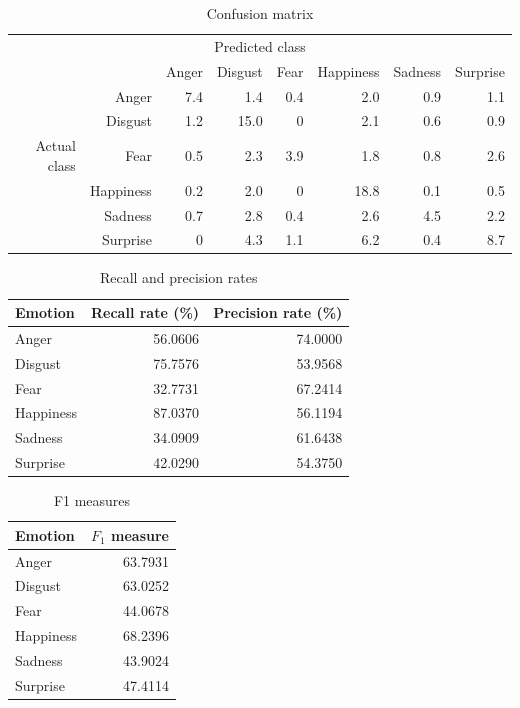\documentclass[12pt]{article}
\begin{document}
\begin{table}
\centering
\begin{tabular}{r r | r r r r r r}
\multicolumn{8}{c}{Predicted class} \\
&  & Anger & Disgust & Fear & Happiness & Sadness & Surprise \\
\hline
& Anger & 7.4 & 1.4  & 0.4 & 2.0  & 0.9 & 1.1 \\
 & Disgust & 1.2 & 15.0 & 0   & 2.1  & 0.6 & 0.9 \\
Actual class & Fear & 0.5 & 2.3  & 3.9 & 1.8  & 0.8 & 2.6 \\
 & Happiness & 0.2 & 2.0  & 0   & 18.8 & 0.1 & 0.5 \\
& Sadness & 0.7 & 2.8  & 0.4 & 2.6  & 4.5 & 2.2 \\
& Surprise & 0   & 4.3  & 1.1 & 6.2  & 0.4 & 8.7 \\
\end{tabular}
\caption{Confusion matrix}
\end{table}

\begin{table}
\centering
\begin{tabular}{l | r r}
Emotion & Recall rate (\%) & Precision rate (\%) \\
\hline
Anger & 56.0606 & 74.0000 \\
Disgust & 75.7576 & 53.9568 \\
Fear & 32.7731 & 67.2414 \\
Happiness & 87.0370 & 56.1194 \\
Sadness & 34.0909 & 61.6438 \\
Surprise & 42.0290 & 54.3750 \\
\end{tabular}
\caption{Recall and precision rates}
\end{table}

\begin{table}
\centering
\begin{tabular}{l | r}
Emotion & \( F_1 \) measure \\
\hline
Anger & 63.7931 \\
Disgust & 63.0252 \\
Fear & 44.0678 \\
Happiness & 68.2396 \\
Sadness & 43.9024 \\
Surprise & 47.4114 \\
\end{tabular}
\caption{F1 measures}
\end{table}
\end{document}
